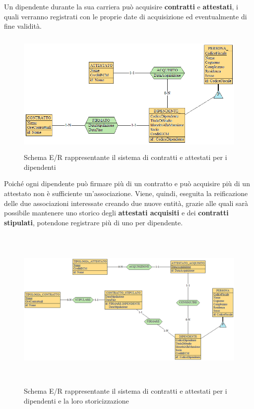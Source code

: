 \documentclass[a4paper, 12pt]{report}
\begin{document}
\noindent
Un dipendente durante la sua carriera può acquisire \textbf{contratti} e \textbf{attestati}, i quali verranno registrati con le proprie date
di acquisizione ed eventualmente di fine validità.

\begin{figure}[H]
        \centering
        \includegraphics[height=6cm]{img/dipendenteContrattiPreReif.png}
        \caption{Schema E/R rappresentante il sistema di contratti e attestati per i dipendenti}
\end{figure}

\noindent
Poiché ogni dipendente può firmare più di un contratto e può acquisire più di un attestato non è sufficiente un'associazione.
Viene, quindi, eseguita la reificazione delle due associazioni interessate creando due nuove entità, grazie alle quali sarà possibile
mantenere uno storico degli \textbf{attestati acquisiti} e dei \textbf{contratti stipulati}, potendone registrare più di uno per dipendente.

\begin{figure}[H]
        \centering
        \includegraphics[height=8cm]{img/dipendenteContrattiPostReif.png}
        \caption{Schema E/R rappresentante il sistema di contratti e attestati per i dipendenti e la loro storicizzazione}
\end{figure}
\end{document}
